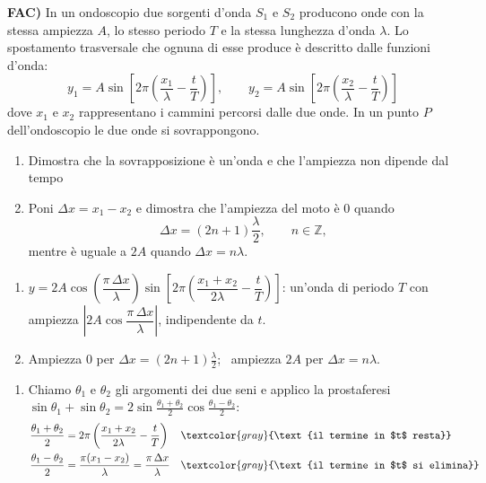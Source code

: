 \begin{question}[ID=fac.1, subtitle={Interferenza di onde: sovrapposizione e ampiezza}, tags={goniometria, fisica, interferenza}, difficulty=difficile]
\textbf{FAC)} In un ondoscopio due sorgenti d'onda $S_1$ e $S_2$ producono onde con la stessa ampiezza $A$, lo stesso periodo $T$ e la stessa lunghezza d'onda $\lambda$.
Lo spostamento trasversale che ognuna di esse produce è descritto dalle funzioni d'onda:
\[
y_1 = A \sin \left[ 2\pi \left( \frac{x_1}{\lambda} - \frac{t}{T} \right) \right], \qquad
y_2 = A \sin \left[ 2\pi \left( \frac{x_2}{\lambda} - \frac{t}{T} \right) \right]
\]
dove $x_1$ e $x_2$ rappresentano i cammini percorsi dalle due onde.
In un punto $P$ dell'ondoscopio le due onde si sovrappongono.

\begin{enumerate}[label=\alph*)]
  \item Dimostra che la sovrapposizione è un'onda e che l'ampiezza non dipende dal tempo
  \item Poni $\Delta x = x_1 - x_2$ e dimostra che l'ampiezza del moto è $0$ quando
  \[
  \Delta x = (2n + 1)\frac{\lambda}{2}, \qquad n \in \mathbb{Z},
  \]
  mentre è uguale a $2A$
  quando $\Delta x = n\lambda$.
\end{enumerate}
\begin{solution}
\begin{enumerate}[label=\alph*)]
    \item $y=2A\cos\left(\dfrac{\pi\,\Delta x}{\lambda}\right)\sin\left[2\pi\left(\dfrac{x_1+x_2}{2\lambda}-\dfrac tT\right)\right]$: un'onda di periodo $T$ con ampiezza $\left|2A\cos\dfrac{\pi\,\Delta x}{\lambda}\right|$, indipendente da $t$.
    \item Ampiezza $0$ per $\Delta x=(2n+1)\tfrac\lambda2$; \ ampiezza $2A$ per $\Delta x=n\lambda$.
\end{enumerate}
\end{solution}
\begin{explanation}
\begin{enumerate}[label=\alph*)]
    \item Chiamo $\theta_1$ e $\theta_2$ gli argomenti dei due seni e applico la prostaferesi $\sin\theta_1+\sin\theta_2=2\sin\tfrac{\theta_1+\theta_2}{2}\cos\tfrac{\theta_1-\theta_2}{2}$:
    \[\begin{aligned}
    \dfrac{\theta_1+\theta_2}{2} &= 2\pi\left(\dfrac{x_1+x_2}{2\lambda}-\dfrac tT\right) && \textcolor{gray}{\text{il termine in $t$ resta}}\\
    \dfrac{\theta_1-\theta_2}{2} &= \dfrac{\pi(x_1-x_2)}{\lambda}=\dfrac{\pi\,\Delta x}{\lambda} && \textcolor{gray}{\text{il termine in $t$ si elimina}}\\

\end{aligned}\]
\end{enumerate}
\end{explanation}
\end{question}
